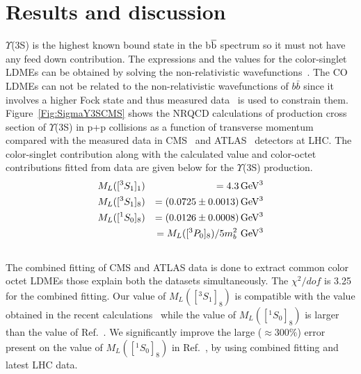 \documentclass[twocolumn,amsmath,amssymb]{snp}
\begin{document}
\section*{Results and discussion}
$\Upsilon$(3S) is the highest known bound state in the b$\overline{\rm b}$ spectrum 
so it must not have any feed down contribution. 
The expressions and the values for the 
color-singlet LDMEs can be obtained by solving the non-relativistic 
wavefunctions~\cite{Cho:1995vh}. 
The CO LDMEs can not be related to the non-relativistic
wavefunctions of $b \bar b$ since it involves a higher Fock state and thus
measured data~\cite{Khachatryan:2015qpa,Aad:2012dlq} is used to constrain them.
Figure~\ref{Fig:SigmaY3SCMS} shows the NRQCD calculations of production cross section of 
$\Upsilon$(3S) in p+p collisions as a function of transverse momentum compared with the 
measured data in CMS~\cite{Khachatryan:2015qpa} and ATLAS~\cite{Khachatryan:2015qpa} 
detectors at LHC. 
The color-singlet contribution along with the calculated value 
and color-octet contributions fitted from data are given below for the 
$\Upsilon$(3S) production.
\begin{eqnarray}
  &M_{L}([^3S_1]_{1}) &= 4.3 \,{\rm GeV^3}\nonumber \\
  &M_{L}([^3S_1]_{8}) &= (0.0725\pm0.0013) \, {\rm GeV^3}\nonumber \\
  &M_{L}([^1S_0]_{8}) &= (0.0126\pm0.0008) \,{\rm GeV^3} \nonumber \\ \nonumber
  &&=  M_{L}([^3P_0]_{8})/5m_{b}^{2}\,\,{\rm GeV^3} \nonumber \\ \nonumber
\end{eqnarray}
The combined fitting of CMS and ATLAS data is done to extract common color octet LDMEs 
those explain both the datasets simultaneously. The $\chi^2/dof$ is 3.25 for the 
combined fitting. Our value of $M_{L}([^3S_1]_{8})$ is compatible with the value obtained in the recent 
calculations~\cite{Sharma:2012dy} while the value of $M_{L}([^1S_0]_{8})$ is larger than
the value of Ref.~\cite{Sharma:2012dy}. We significantly improve the large ($\approx 300\%$) error 
present on the value of $M_{L}([^1S_0]_{8})$ in Ref.~\cite{Sharma:2012dy}, by using combined 
fitting and latest LHC data.
\end{document}
